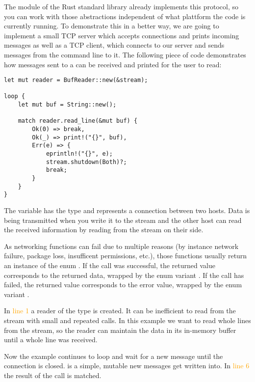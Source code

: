 The module  of the Rust standard library already implements this protocol, so you can work with those
abstractions independent of what plattform the code is currently running. To demonstrate this in a better way, we are
going to implement a small TCP server which accepts connections and prints incoming messages as well as a TCP client,
which connects to our server and sends messages from the command line to it. The following piece of code demonstrates
how messages sent to a  can be received and printed for the user to read:

\begin{verbatim}
let mut reader = BufReader::new(&stream);

loop {
    let mut buf = String::new();

    match reader.read_line(&mut buf) {
        Ok(0) => break,
        Ok(_) => print!("{}", buf),
        Err(e) => {
            eprintln!("{}", e);
            stream.shutdown(Both)?;
            break;
        }
    }
}
\end{verbatim}

The variable  has the type  and represents a connection between two hosts. Data is being
transmitted when you write it to the stream and the other host can read the received information by reading from the
stream on their side.

As networking functions can fail due to multiple reasons (by instance network failure, package loss, insufficent
permissions, etc.), those functions usually return an instance of the enum . If the call was
successful, the returned value corresponds to the returned data, wrapped by the enum variant . If the call
has failed, the returned value corresponds to the error value, wrapped by the enum variant .

In \textcolor{orange}{line 1} a reader of the type  is created. It can be inefficient to read
from the stream with small and repeated calls. In this example we want to read whole lines from the stream, so the
reader can maintain the data in its in-memory buffer until a whole line was received.

Now the example continues to loop and wait for a new message until the connection is closed.  is a simple,
mutable  new messages get written into. In \textcolor{orange}{line 6} the result of the call
 is matched.

